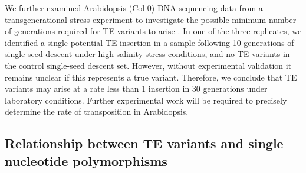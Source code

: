 \documentclass[12pt]{article}
\begin{document}
We further examined Arabidopsis (Col-0) DNA sequencing data from a
transgenerational stress experiment to investigate the possible
minimum number of generations required for TE variants to arise
\cite{Jiang:2014ih}. In one of the three replicates, we identified a
single potential TE insertion in a sample following 10 generations of
single-seed descent under high salinity stress conditions, and no TE
variants in the control single-seed descent set. However, without
experimental validation it remains unclear if this represents a true
variant. Therefore, we conclude that TE variants may arise at a rate
less than 1 insertion in 30 generations under laboratory
conditions. Further experimental work will be required to precisely
determine the rate of transposition in Arabidopsis.

\subsection{Relationship between TE variants and single nucleotide
polymorphisms}
\end{document}
